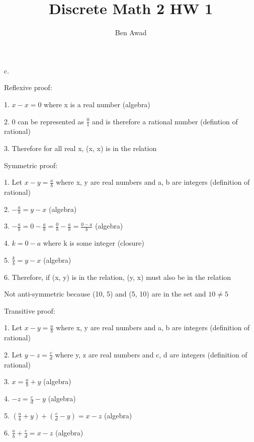 \documentclass[12pt]{article}
\newenvironment{problem}[2][Problem]{\begin{trivlist}
\item[\hskip \labelsep {\bfseries #1}\hskip \labelsep {\bfseries #2.}]}{\end{trivlist}}
\begin{document}
 
 
\title{Discrete Math 2 HW 1}
\author{Ben Awad}
\maketitle
 
\begin{problem}{9.1.6}
\end{problem}
c. 

Reflexive proof:

1. $x - x = 0$ where x is a real number (algebra)

2. 0 can be represented as $\frac{0}{1}$ and is therefore a rational number (defintion of rational)

3. Therefore for all real x, (x, x) is in the relation

Symmetric proof:

1. Let $x - y = \frac{a}{b}$ where x, y are real numbers and a, b are integers (definition of rational)

2. $-\frac{a}{b} = y - x$ (algebra)

3. $-\frac{a}{b} = 0 - \frac{a}{b} = \frac{0}{b} - \frac{a}{b} = \frac{0-a}{b}$ (algebra)

4. $k = 0-a$ where k is some integer (closure) 

5. $\frac{k}{b} = y - x$ (algebra)

6. Therefore, if (x, y) is in the relation, (y, x) must also be in the relation

Not anti-symmetric because (10, 5) and (5, 10) are in the set and $10 \neq 5$

Transitive proof:

1. Let $x - y = \frac{a}{b}$ where x, y are real numbers and a, b are integers (definition of rational)

2. Let $y - z = \frac{c}{d}$ where y, z are real numbers and c, d are integers (definition of rational)

3. $x = \frac{a}{b} + y$ (algebra)

4. $-z = \frac{c}{d} - y$ (algebra)

5. $(\frac{a}{b} + y) + (\frac{c}{d} - y) = x - z$ (algebra)

6. $\frac{a}{b} + \frac{c}{d} = x - z$ (algebra)
\end{document}
